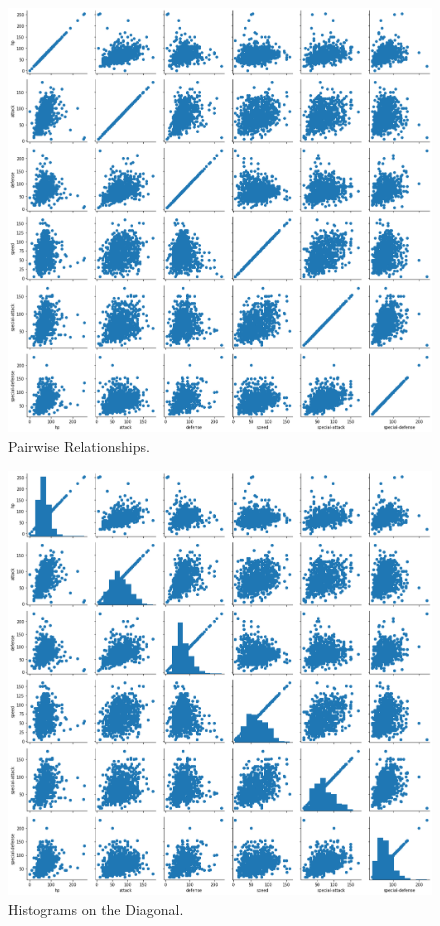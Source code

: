 \begin{figure}
	\includegraphics[width=\textwidth,height=\textheight,keepaspectratio]{images/figure41.png}
	\caption{Pairwise Relationships.}\label{fig:figure41}
\end{figure}

\begin{figure}
	\includegraphics[width=\textwidth,height=\textheight,keepaspectratio]{images/figure42.png}
	\caption{Histograms on the Diagonal.}\label{fig:figure42}
\end{figure}

